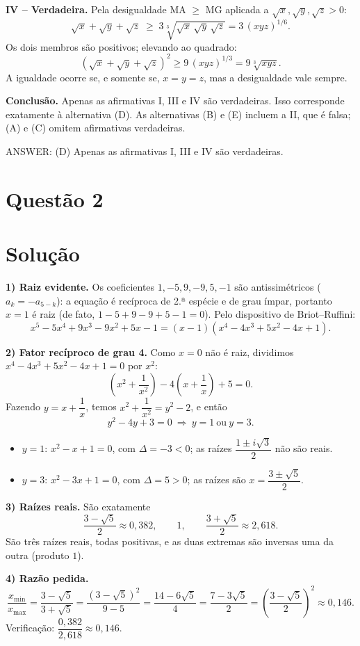 \documentclass{article}%
\begin{document}
\medskip
\textbf{IV -- Verdadeira.} Pela desigualdade MA $\ge$ MG aplicada a $\sqrt x,\sqrt y,\sqrt z>0$:
\[
\sqrt x+\sqrt y+\sqrt z\;\ge\;3\sqrt[3]{\sqrt x\,\sqrt y\,\sqrt z}=3\,(xyz)^{1/6}.
\]
Os dois membros são positivos; elevando ao quadrado:
\[
\left(\sqrt x+\sqrt y+\sqrt z\right)^2\ge 9\,(xyz)^{1/3}=9\sqrt[3]{xyz}.
\]
A igualdade ocorre se, e somente se, $x=y=z$, mas a desigualdade vale sempre.

\medskip
\textbf{Conclusão.} Apenas as afirmativas I, III e IV são verdadeiras. Isso corresponde exatamente à alternativa (D). As alternativas (B) e (E) incluem a II, que é falsa; (A) e (C) omitem afirmativas verdadeiras.

\medskip
ANSWER: (D) Apenas as afirmativas I, III e IV são verdadeiras.%
\newpage%
\section*{Questão 2}

\section*{Solução}

\textbf{1) Raiz evidente.} Os coeficientes $1,-5,9,-9,5,-1$ são antissimétricos ($a_k=-a_{5-k}$): a equação é recíproca de 2.ª espécie e de grau ímpar, portanto $x=1$ é raiz (de fato, $1-5+9-9+5-1=0$). Pelo dispositivo de Briot--Ruffini:
\[
x^5-5x^4+9x^3-9x^2+5x-1=(x-1)\left(x^4-4x^3+5x^2-4x+1\right).
\]

\textbf{2) Fator recíproco de grau 4.} Como $x=0$ não é raiz, dividimos $x^4-4x^3+5x^2-4x+1=0$ por $x^2$:
\[
\left(x^2+\frac{1}{x^2}\right)-4\left(x+\frac{1}{x}\right)+5=0 .
\]
Fazendo $y=x+\dfrac1x$, temos $x^2+\dfrac1{x^2}=y^2-2$, e então
\[
y^2-4y+3=0\ \Longrightarrow\ y=1\ \text{ou}\ y=3 .
\]
\begin{itemize}
\item $y=1$: $x^2-x+1=0$, com $\Delta=-3<0$; as raízes $\dfrac{1\pm i\sqrt3}{2}$ não são reais.
\item $y=3$: $x^2-3x+1=0$, com $\Delta=5>0$; as raízes são $x=\dfrac{3\pm\sqrt5}{2}$.
\end{itemize}

\textbf{3) Raízes reais.} São exatamente
\[
\frac{3-\sqrt5}{2}\approx 0{,}382,\qquad 1,\qquad \frac{3+\sqrt5}{2}\approx 2{,}618 .
\]
São três raízes reais, todas positivas, e as duas extremas são inversas uma da outra (produto $1$).

\textbf{4) Razão pedida.}
\[
\frac{x_{\min}}{x_{\max}}=\frac{3-\sqrt5}{3+\sqrt5}
=\frac{(3-\sqrt5)^2}{9-5}=\frac{14-6\sqrt5}{4}
=\frac{7-3\sqrt5}{2}=\left(\frac{3-\sqrt5}{2}\right)^2\approx 0{,}146 .
\]
Verificação: $\dfrac{0{,}382}{2{,}618}\approx 0{,}146$.
\end{document}

